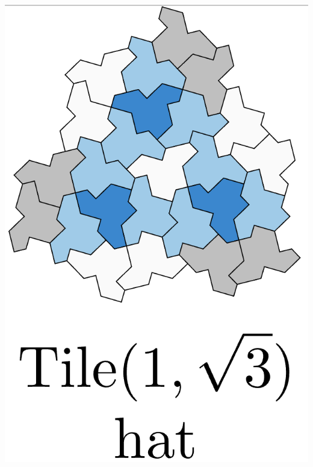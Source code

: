 \documentclass[class=beamer, crop=false]{standalone}
\begin{document}
\begin{minipage}{0.24\textwidth}
\begin{minipage}[t]{0.24\textwidth}
    \includegraphics[width=\linewidth]{images/polykite-family/hat(1,sqrt(3)).png}
  \end{minipage}\hfill
  \begin{minipage}[t]{0.24\textwidth}
    \centering

\end{minipage}
\end{minipage}
\end{document}
